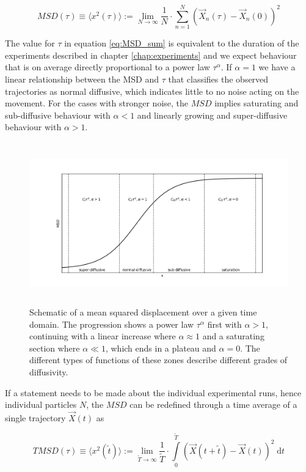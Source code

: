 \begin{equation}
\label{eq:MSD_sum}
    MSD(\tau)\equiv\langle x^2(\tau)\rangle:=\lim\limits_{N\rightarrow\infty}\frac{1}{N}\cdot\sum\limits_{n=1}^N\left(\vec{X}_n(\tau)-\vec{X}_n(0)\right)^2  
\end{equation}

The value for $\tau$ in equation \ref{eq:MSD_sum} is equivalent to the duration of the experiments described in chapter \ref{chap:experiments} and we expect behaviour that is on average directly proportional to a power law $\tau^{\alpha}$. If $\alpha = 1$ we have a linear relationship between the MSD and $\tau$ that classifies the observed trajectories as normal diffusive, which indicates \cite{Lindner2008} little to no noise acting on the movement. For the cases with stronger noise, the $MSD$ implies saturating and sub-diffusive behaviour with $\alpha < 1$ and linearly growing and super-diffusive behaviour with $\alpha > 1$.

\begin{figure}
    \centering
    \includegraphics[width=14cm, height=7cm]{figures/2021_12_02_RTS_schematic_MSD.png}
    \caption{Schematic of a mean squared displacement over a given time domain. The progression shows a power law $\tau^{\alpha}$ first with $\alpha > 1$, continuing with a linear increase where $\alpha \approx 1$ and a saturating section where $\alpha \ll 1$, which ends in a plateau and $\alpha=0$. The different types of functions of these zones describe different grades of diffusivity.}
    \label{fig:MSD_schematic}
\end{figure}

If a statement needs to be made about the individual experimental runs, hence individual particles $N$, the $MSD$ can be redefined through a time average of a single trajectory $\vec{X}(t)$ as

\begin{equation}
\label{eq:MSD_int}
    TMSD(\tau) \equiv \langle x^2(\tilde{t})\rangle:=\lim\limits_{\tilde{T}\rightarrow\infty}\frac{1}{\tilde{T}}\cdot\int\limits_0^{\tilde{T}}\left(\vec{X}(t+\tilde{t})-\vec{X}(t)\right)^2\;\mathrm{d}t
\end{equation}

